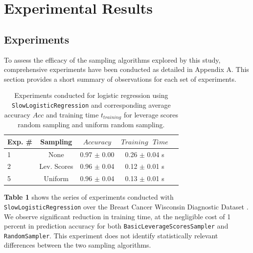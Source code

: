 \documentclass{article}
\theoremstyle{plain}
\theoremstyle{definition}
\theoremstyle{remark}
\begin{document}
\section{Experimental Results}

\subsection{Experiments}

To assess the efficacy of the sampling algorithms explored by this study, comprehensive experiments have been conducted as detailed in Appendix A. This section provides a short summary of observations for each set of experiments.

\begin{table}[t]
	\caption{Experiments conducted for logistic regression using \texttt{SlowLogisticRegression} and corresponding average accuracy $Acc$ and training time $t_{training}$ for leverage scores random sampling and uniform random sampling.}
	\label{t1}
	\vskip 0.15in
	\begin{center}
		\begin{small}
			\begin{sc}
				\begin{tabular}{lcccr}
					\toprule
					Exp. \# & Sampling & $Accuracy$ & $Training \text{ } Time$\\
					\midrule
					1 & None & 0.97 $\pm$ 0.00 & 0.26 $\pm$ 0.04 s \\
					2 & Lev. Scores & 0.96 $\pm$ 0.04 & 0.12 $\pm$ 0.01 s \\
					5 & Uniform & 0.96 $\pm$ 0.04 & 0.13 $\pm$ 0.01 s \\
					\bottomrule
				\end{tabular}
			\end{sc}
		\end{small}
	\end{center}
	\vskip -0.1in
\end{table}

\textbf{Table 1} shows the series of experiments conducted with \texttt{SlowLogisticRegression} over the Breast Cancer Wisconsin Diagnostic Dataset \cite{breastcancer}. We observe significant reduction in training time, at the negligible cost of 1 percent in prediction accuracy for both \texttt{BasicLeverageScoresSampler} and \texttt{RandomSampler}. This experiment does not identify statistically relevant differences between the two sampling algorithms.
\end{document}
